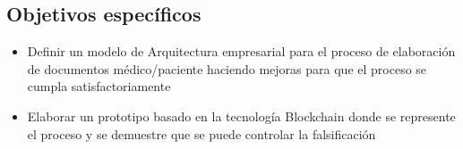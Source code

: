 \subsection{Objetivos específicos}
\begin{itemize}

\item Definir un modelo de Arquitectura empresarial para el proceso de elaboración de documentos médico/paciente haciendo mejoras para que el proceso se cumpla satisfactoriamente

\item Elaborar un prototipo basado en la tecnología Blockchain donde se represente el proceso y se demuestre que se puede controlar la falsificación
\end{itemize}




